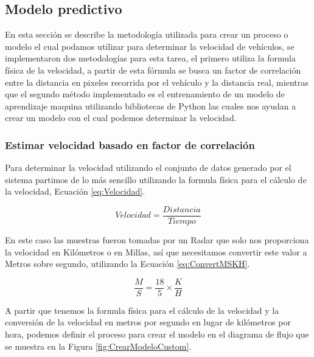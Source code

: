 \subsection{Modelo predictivo}
\label{cap:EstimacionVelocidad}

En esta sección se describe la metodología utilizada para crear un proceso o modelo el cual podamos utilizar para determinar la velocidad de vehículos, se implementaron dos metodologías para esta tarea, el primero utiliza la formula física de la velocidad, a partir de esta fórmula se busca un factor de correlación entre la distancia en pixeles recorrida por el vehículo y la distancia real, mientras que el segundo método implementado es el entrenamiento de un modelo de aprendizaje maquina utilizando bibliotecas de Python las cuales nos ayudan a crear un modelo con el cual podemos determinar la velocidad.

\subsubsection{Estimar velocidad basado en factor de correlación}

Para determinar la velocidad utilizando el conjunto de datos generado por el sistema partimos de lo más sencillo utilizando la formula física para el cálculo de la velocidad, Ecuación \ref{eq:Velocidad}.

\begin{equation}
    \label{eq:Velocidad}
    Velocidad = \frac{Distancia}{Tiempo}
\end{equation}

En este caso las muestras fueron tomadas por un Radar que solo nos proporciona la velocidad en Kilómetros o en Millas, así que necesitamos convertir este valor a Metros sobre segundo, utilizando la Ecuación \ref{eq:ConvertMSKH}.

\begin{equation}
    \label{eq:ConvertMSKH}
    \frac{M}{S} = \frac{18}{5} \times \frac{K}{H}
\end{equation}

A partir que tenemos la formula física para el cálculo de la velocidad y la conversión de la velocidad en metros por segundo en lugar de kilómetros por hora, podemos definir el proceso para crear el modelo en el diagrama de flujo que se muestra en la Figura \ref{fig:CrearModeloCustom}.

